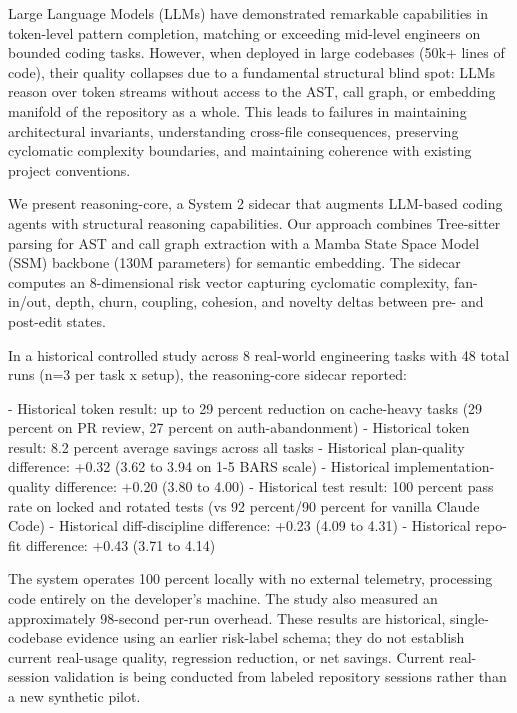 
Large Language Models (LLMs) have demonstrated remarkable capabilities in token-level pattern completion, matching or exceeding mid-level engineers on bounded coding tasks. However, when deployed in large codebases (50k+ lines of code), their quality collapses due to a fundamental structural blind spot: LLMs reason over token streams without access to the AST, call graph, or embedding manifold of the repository as a whole. This leads to failures in maintaining architectural invariants, understanding cross-file consequences, preserving cyclomatic complexity boundaries, and maintaining coherence with existing project conventions.

We present reasoning-core, a System 2 sidecar that augments LLM-based coding agents with structural reasoning capabilities. Our approach combines Tree-sitter parsing for AST and call graph extraction with a Mamba State Space Model (SSM) backbone (130M parameters) for semantic embedding. The sidecar computes an 8-dimensional risk vector capturing cyclomatic complexity, fan-in/out, depth, churn, coupling, cohesion, and novelty deltas between pre- and post-edit states.

In a historical controlled study across 8 real-world engineering tasks with 48
total runs (n=3 per task x setup), the reasoning-core sidecar reported:

- Historical token result: up to 29 percent reduction on cache-heavy tasks (29 percent on PR review, 27 percent on auth-abandonment)
- Historical token result: 8.2 percent average savings across all tasks
- Historical plan-quality difference: +0.32 (3.62 to 3.94 on 1-5 BARS scale)
- Historical implementation-quality difference: +0.20 (3.80 to 4.00)
- Historical test result: 100 percent pass rate on locked and rotated tests (vs 92 percent/90 percent for vanilla Claude Code)
- Historical diff-discipline difference: +0.23 (4.09 to 4.31)
- Historical repo-fit difference: +0.43 (3.71 to 4.14)

The system operates 100 percent locally with no external telemetry, processing
code entirely on the developer's machine. The study also measured an
approximately 98-second per-run overhead. These results are historical,
single-codebase evidence using an earlier risk-label schema; they do not
establish current real-usage quality, regression reduction, or net savings.
Current real-session validation is being conducted from labeled repository
sessions rather than a new synthetic pilot.

